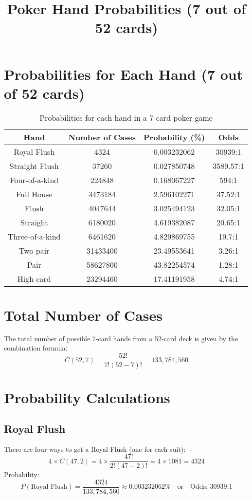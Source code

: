 \documentclass{article}
\begin{document}
\title{Poker Hand Probabilities (7 out of 52 cards)}
\author{}
\date{}
\maketitle

\section*{Probabilities for Each Hand (7 out of 52 cards)}

\begin{table}[h!]
\centering
\begin{tabular}{|c|c|c|c|}
\hline
\textbf{Hand} & \textbf{Number of Cases} & \textbf{Probability (\%)} & \textbf{Odds} \\
\hline
Royal Flush & 4324 & 0.003232062 & 30939:1 \\
\hline
Straight Flush & 37260 & 0.027850748 & 3589.57:1 \\
\hline
Four-of-a-kind & 224848 & 0.168067227 & 594:1 \\
\hline
Full House & 3473184 & 2.596102271 & 37.52:1 \\
\hline
Flush & 4047644 & 3.025494123 & 32.05:1 \\
\hline
Straight & 6180020 & 4.619382087 & 20.65:1 \\
\hline
Three-of-a-kind & 6461620 & 4.829869755 & 19.7:1 \\
\hline
Two pair & 31433400 & 23.49553641 & 3.26:1 \\
\hline
Pair & 58627800 & 43.82254574 & 1.28:1 \\
\hline
High card & 23294460 & 17.41191958 & 4.74:1 \\
\hline
\end{tabular}
\caption{Probabilities for each hand in a 7-card poker game}
\end{table}

\section*{Total Number of Cases}
The total number of possible 7-card hands from a 52-card deck is given by the combination formula:
\[
C(52, 7) = \frac{52!}{7!(52-7)!} = 133,784,560
\]

\section*{Probability Calculations}
\subsection*{Royal Flush}
There are four ways to get a Royal Flush (one for each suit):
\[
4 \times C(47, 2) = 4 \times \frac{47!}{2!(47-2)!} = 4 \times 1081 = 4324
\]
Probability:
\[
P(\text{Royal Flush}) = \frac{4324}{133,784,560} \approx 0.003232062\% \quad \text{or} \quad \text{Odds: 30939:1}
\]
\end{document}
